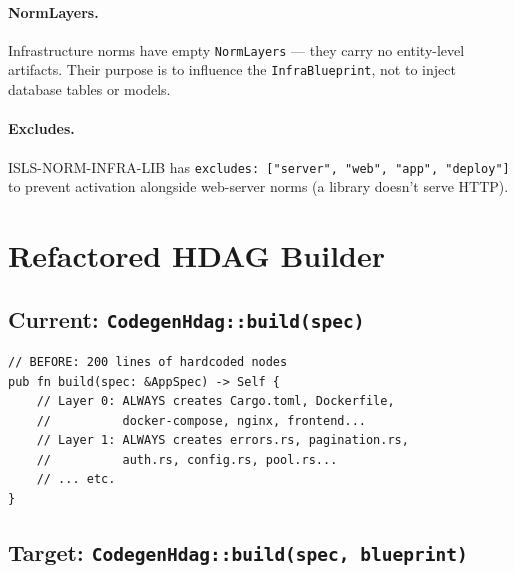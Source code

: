 \documentclass[11pt,a4paper]{article}
\begin{document}
\paragraph{NormLayers.} Infrastructure norms have empty 
\texttt{NormLayers} --- they carry no entity-level artifacts. Their 
purpose is to influence the \texttt{InfraBlueprint}, not to inject 
database tables or models.

\paragraph{Excludes.} ISLS-NORM-INFRA-LIB has 
\texttt{excludes: ["server", "web", "app", "deploy"]} to prevent 
activation alongside web-server norms (a library doesn't serve HTTP).


\section{Refactored HDAG Builder}
\label{sec:hdag-refactor}

\subsection{Current: \texttt{CodegenHdag::build(spec)}}

\begin{lstlisting}[style=rust]
// BEFORE: 200 lines of hardcoded nodes
pub fn build(spec: &AppSpec) -> Self {
    // Layer 0: ALWAYS creates Cargo.toml, Dockerfile, 
    //          docker-compose, nginx, frontend...
    // Layer 1: ALWAYS creates errors.rs, pagination.rs, 
    //          auth.rs, config.rs, pool.rs...
    // ... etc.
}
\end{lstlisting}

\subsection{Target: \texttt{CodegenHdag::build(spec, blueprint)}}
\end{document}
